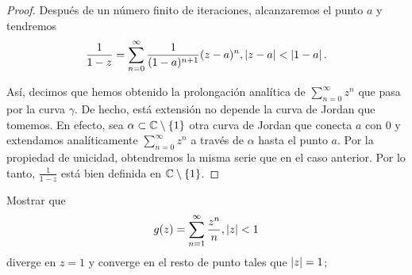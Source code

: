 \begin{proof}
Después de un número finito de iteraciones, alcanzaremos el punto $a$ y tendremos
\begin{equation*}
    \frac{1}{1-z} = \sum_{n=0}^{\infty} \frac{1}{(1 - a)^{n+1}} (z - a)^n , \left\lvert z - a\right\rvert < \left\lvert1 - a\right\rvert.
\end{equation*}

Así, decimos que hemos obtenido la prolongación analítica de $\sum_{n=0}^{\infty} z^n$ que pasa por la curva $\gamma$. De hecho, está extensión no depende la curva de Jordan que tomemos. En efecto, sea $\alpha \subset \mathbb{C} \setminus \{1\}$ otra curva de Jordan que conecta $a$ con $0$ y extendamos analíticamente $\sum_{n=0}^{\infty} z^n$ a través de $\alpha$ hasta el punto $a$. Por la propiedad de unicidad, obtendremos la misma serie que en el caso anterior. Por lo tanto, $\frac{1}{1 - z}$ está bien definida en $\mathbb{C} \setminus \{1\}$.
\end{proof}


\begin{example}
    Mostrar que
    \begin{equation*}
        g(z) = \sum_{n=1}^{\infty} \frac{z^n}{n}, \left\lvert z\right\rvert < 1
    \end{equation*}
    diverge en $z = 1$  y converge en el resto de punto tales que $\left\lvert z\right\rvert = 1$;

\end{example}

